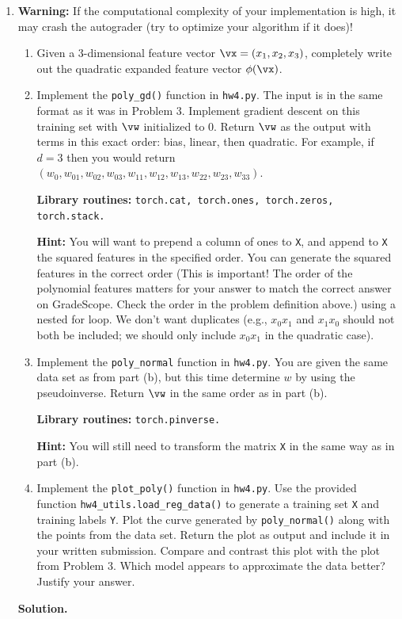 \documentclass{article}
\theoremstyle{definition}
\theoremstyle{remark}
\newenvironment{Q}
{%
  \clearpage
  \item
  }
  {%
    \phantom{s} %
    \bigskip
    \textbf{Solution.}
  }
\begin{document}
\begin{enumerate}[font={\Large\bfseries},left=0pt]
\begin{Q}
  \textbf{Warning:} If the computational complexity of your implementation is high, it may crash the autograder (try to optimize your algorithm if it does)!
  \begin{enumerate}
  \item Given a $3$-dimensional feature vector $\vx = (x_1,x_2,x_3)$, completely write out the quadratic expanded feature vector $\phi(\vx)$.
  \item Implement the \texttt{poly\_gd()} function in \texttt{hw4.py}.  The input is in the same format as it was in Problem 3.  Implement gradient descent on this training set with $\vw$ initialized to 0.  Return $\vw$ as the output with terms in this exact order: bias, linear, then quadratic.  For example, if $d = 3$ then you would return $(w_0, w_{01},w_{02},w_{03},w_{11},w_{12},w_{13},w_{22},w_{23},w_{33})$.
  
  \textbf{Library routines:} \texttt{torch.cat, torch.ones, torch.zeros, torch.stack.}
  
  \textbf{Hint:} You will want to prepend a column of ones to \texttt{X}, and append to \texttt{X} the squared features in the specified order. You can generate the squared features in the correct order (This is important! The order of the polynomial features matters for your answer to match the correct answer on GradeScope. Check the order in the problem definition above.) using a nested for loop. We don't want duplicates (e.g., $x_0 x_1$ and $x_1 x_0$ should not both be included; we should only include $x_0 x_1$ in the quadratic case).
  
  \item Implement the \texttt{poly\_normal} function in \texttt{hw4.py}.  You are given the same data set as from part (b), but this time determine $w$ by using the pseudoinverse.  Return $\vw$ in the same order as in part (b).
  
  \textbf{Library routines:} \texttt{torch.pinverse.}
  
  \textbf{Hint:} You will still need to transform the matrix \texttt{X} in the same way as in part (b).
  
  \item Implement the \texttt{plot\_poly()} function in \texttt{hw4.py}.  Use the provided function \texttt{hw4\_utils.load\_reg\_data()} to generate a training set \texttt{X} and training labels \texttt{Y}. Plot the curve generated by \texttt{poly\_normal()} along with the points from the data set.  Return the plot as output and include it in your written submission.  Compare and contrast this plot with the plot from Problem 3.  Which model appears to approximate the data better? Justify your answer.
  

\end{enumerate}
\end{Q}
\end{enumerate}
\end{document}
